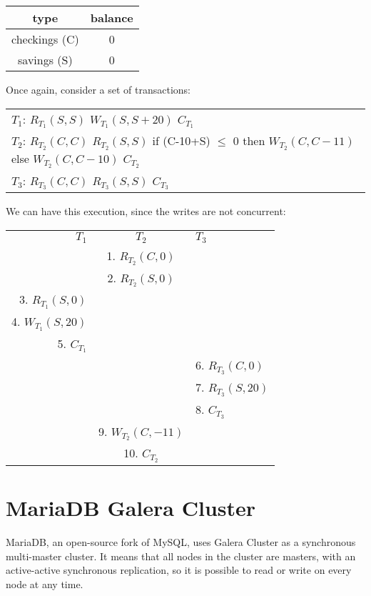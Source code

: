 \begin{table}[H]
  \centering
  \begin{tabular}{ c | c }
    type & balance \\
    \hline
    checkings (C) & 0 \\
    savings (S) & 0 \\
  \end{tabular}
\end{table}

Once again, consider a set of transactions:
\begin{table}[H]
  \centering
  \begin{tabular}{ l }
    $T{_1}$:   $R_{T_1}(S, S)$ $W_{T_1}(S, S+20)$ $C_{T_1}$ \\
    $T{_2}$:   $R_{T_2}(C, C)$ $R_{T_2}(S, S)$ if (C-10+S) $\leq$ 0 then $W_{T_2}(C, C-11)$ else $W_{T_2}(C, C-10)$ $C_{T_2}$ \\
    $T{_3}$:   $R_{T_3}(C, C)$ $R_{T_3}(S, S)$ $C_{T_3}$ \\
  \end{tabular}
\end{table}

We can have this execution, since the writes are not concurrent:

\begin{table}[H]
  \centering
  \begin{tabular}{ r | c | l }
    $T_1$ & $T_2$ & $T_3$ \\
    & 1. $R_{T_2}(C,0)$ & \\
    & 2. $R_{T_2}(S,0)$ & \\
    3. $R_{T_1}(S,0)$ & & \\
    4. $W_{T_1}(S,20)$ & & \\
    5. $C_{T_1}$ & & \\
    & & 6. $R_{T_3}(C,0)$ \\
    & & 7. $R_{T_3}(S,20)$ \\
    & & 8. $C_{T_3}$ \\
    & 9. $W_{T_2}(C,-11)$ & \\
    & 10. $C_{T_2}$ & \\
  \end{tabular}
\end{table}






\section{MariaDB Galera Cluster}
\label{sec:galera-cluster}
MariaDB, an open-source fork of MySQL, uses Galera Cluster as a synchronous multi-master cluster. It means that all nodes in the cluster are masters, with an active-active synchronous replication, so it is possible to read or write on every node at any time.



